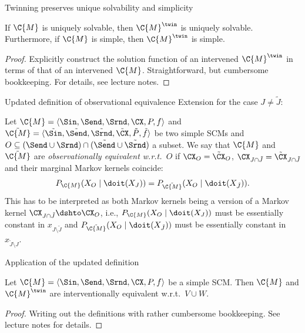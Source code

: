 \begin{frame}{Twinning preserves unique solvability and simplicity}    
\begin{Prp}
If $\C{M}$ is uniquely solvable, then $\C{M}^{\twin}$ is uniquely solvable.
Furthermore, if $\C{M}$ is simple, then $\C{M}^{\twin}$ is simple.
\end{Prp}
\begin{proof}
  Explicitly construct the solution function of an intervened $\C{M}^{\twin}$ in terms of that of an intervened $\C{M}$.
  Straightforward, but cumbersome bookkeeping. For details, see lecture notes. 
\end{proof}
\end{frame}

\begin{frame}{Updated definition of observational equivalence}
  Extension for the case $J \ne \tilde{J}$:
  \begin{definition}
  Let $\C{M} = \langle \Sin, \Send, \Srnd, \CX, P, f \rangle$ and
  $\tilde{\C{M}} = \langle \tilde{\Sin}, \tilde{\Send}, \tilde{\Srnd}, \tilde{\CX}, \tilde{P}, \tilde{f} \rangle$ be two simple SCMs
  and $O \subseteq (\Send \cup \Srnd) \cap (\tilde{\Send} \cup \tilde{\Srnd})$ a subset.
  We say that
  $\C{M}$ and $\tilde{\C{M}}$ are \emph{observationally equivalent w.r.t.\ $O$} if $\CX_O = \tilde{\CX}_O$, $\CX_{J \cap \tilde{J}} = \tilde{\CX}_{J \cap \tilde{J}}$ and their marginal Markov kernels coincide:
      $$P_{\C{M}}(X_O \mid \doit(X_J)) = P_{\tilde{\C{M}}}(X_O \mid \doit(X_{\tilde J})).$$
    This has to be interpreted as both Markov kernels being a version of a Markov kernel $\CX_{J \cap \tilde{J}} \dshto \CX_O$,
    i.e., $P_{\C{M}}(X_O \mid \doit(X_J))$ must be essentially constant in $x_{J \setminus \tilde{J}}$ and
    $P_{\tilde{\C{M}}}(X_O \mid \doit(X_{\tilde{J}}))$ must be essentially constant in $x_{\tilde{J} \setminus J}$.
\end{definition}
\end{frame}

\begin{frame}{Application of the updated definition}
\begin{Lem}
Let $\C{M} = \langle \Sin, \Send, \Srnd, \CX, P, f \rangle$ be a simple SCM. Then
$\C{M}$ and $\C{M}^\twin$ are interventionally equivalent w.r.t.\ $V \cup W$.
\end{Lem}
\begin{proof}
  Writing out the definitions with rather cumbersome bookkeeping.
  See lecture notes for details.
\end{proof}
\end{frame}

